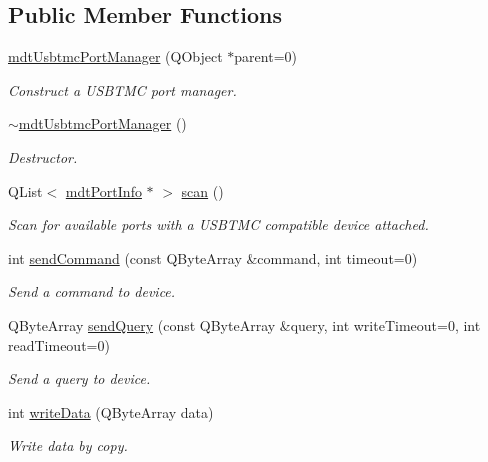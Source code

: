 \subsection*{Public Member Functions}
\begin{DoxyCompactItemize}
\item 
\hyperlink{classmdt_usbtmc_port_manager_a99a24e4360e70ffc63677dbe888513f7}{mdtUsbtmcPortManager} (QObject $\ast$parent=0)
\begin{DoxyCompactList}\small\item\em Construct a USBTMC port manager. \end{DoxyCompactList}\item 
\hyperlink{classmdt_usbtmc_port_manager_aad6b2eef9b5cfb5c324affb6962a463b}{$\sim$mdtUsbtmcPortManager} ()
\begin{DoxyCompactList}\small\item\em Destructor. \end{DoxyCompactList}\item 
QList$<$ \hyperlink{classmdt_port_info}{mdtPortInfo} $\ast$ $>$ \hyperlink{classmdt_usbtmc_port_manager_a992d1227810186d3c7dc166452e2e3b6}{scan} ()
\begin{DoxyCompactList}\small\item\em Scan for available ports with a USBTMC compatible device attached. \end{DoxyCompactList}\item 
int \hyperlink{classmdt_usbtmc_port_manager_aaab645cfcafbac7a83a69f2084900246}{sendCommand} (const QByteArray \&command, int timeout=0)
\begin{DoxyCompactList}\small\item\em Send a command to device. \end{DoxyCompactList}\item 
QByteArray \hyperlink{classmdt_usbtmc_port_manager_a858590909ce63319a3390140c4d0a6ca}{sendQuery} (const QByteArray \&query, int writeTimeout=0, int readTimeout=0)
\begin{DoxyCompactList}\small\item\em Send a query to device. \end{DoxyCompactList}\item 
int \hyperlink{classmdt_usbtmc_port_manager_ab7229e9d519e80a6509bec90dc9239b3}{writeData} (QByteArray data)
\begin{DoxyCompactList}\small\item\em Write data by copy. \end{DoxyCompactList}\item 

\end{DoxyCompactItemize}
